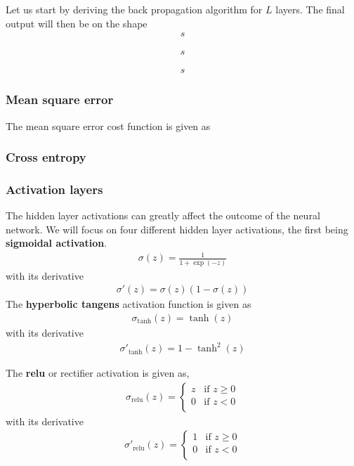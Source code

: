 Let us start by deriving the back propagation algorithm for $L$ layers. The final output will then be on the shape 
\begin{align*}
s
\end{align*}

\begin{align*}
s
\end{align*}

\begin{align*}
s
\end{align*}


\subsubsection{Mean square error}
The mean square error cost function is given as 

\subsubsection{Cross entropy}

\subsubsection{Activation layers} \label{sec:layer-acts}
The hidden layer activations can greatly affect the outcome of the neural network. We will focus on four different hidden layer activations, the first being \textbf{sigmoidal activation}.
\begin{align}
    \sigma (z) = \frac{1}{1 + \exp (-z)}
    \label{eq:act-sig}
\end{align}
with its derivative
\begin{align}
    \sigma'(z) = \sigma(z)(1 - \sigma(z))
    \label{eq:act-sig-der}
\end{align}
The \textbf{hyperbolic tangens} activation function is given as
\begin{align}
    \sigma_\mathrm{tanh}(z) = \tanh(z)
    \label{eq:act-tanh}
\end{align}
with its derivative
\begin{align}
    \sigma'_\mathrm{tanh}(z) = 1 - \tanh^2(z)
    \label{eq:act-tanh-der}
\end{align}

The \textbf{relu} or rectifier activation is given as,
\begin{align}
    \sigma_\mathrm{relu}(z) = 
    \begin{cases}
        z & \text{if } z \geq 0 \\
        0 & \text{if } z < 0 \\
    \end{cases}
    \label{eq:act-relu}
\end{align}
with its derivative
\begin{align}
    \sigma'_\mathrm{relu}(z) = 
    \begin{cases}
        1 & \text{if } z \geq 0 \\
        0 & \text{if } z < 0 \\
    \end{cases}
    \label{eq:act-relu-der}
\end{align}

